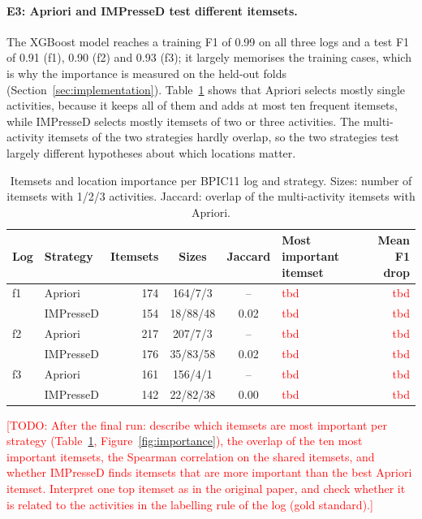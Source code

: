 \documentclass{article}
\newcommand{\todo}[1]{\textcolor{red}{[TODO: #1]}}
\newcommand{\tbd}{\textcolor{red}{tbd}}
\begin{document}
\paragraph{E3: Apriori and IMPresseD test different itemsets.} The XGBoost model reaches a training F1 of 0.99 on all three logs and a test F1 of 0.91 (f1), 0.90 (f2) and 0.93 (f3); it largely memorises the training cases, which is why the importance is measured on the held-out folds (Section~\ref{sec:implementation}). Table~\ref{tab:selection} shows that Apriori selects mostly single activities, because it keeps all of them and adds at most ten frequent itemsets, while IMPresseD selects mostly itemsets of two or three activities. The multi-activity itemsets of the two strategies hardly overlap, so the two strategies test largely different hypotheses about which locations matter.

\begin{table}[H]
    \centering
    \caption{Itemsets and location importance per BPIC11 log and strategy. Sizes: number of itemsets with 1/2/3 activities. Jaccard: overlap of the multi-activity itemsets with Apriori.}
    \label{tab:selection}
    \small
    \begin{tabular}{@{}llrcclr@{}}
        \toprule
        Log & Strategy & Itemsets & Sizes & Jaccard & Most important itemset & Mean F1 drop \\
        \midrule
        f1 & Apriori & 174 & 164/7/3 & -- & \tbd & \tbd \\
           & IMPresseD & 154 & 18/88/48 & 0.02 & \tbd & \tbd \\
        f2 & Apriori & 217 & 207/7/3 & -- & \tbd & \tbd \\
           & IMPresseD & 176 & 35/83/58 & 0.02 & \tbd & \tbd \\
        f3 & Apriori & 161 & 156/4/1 & -- & \tbd & \tbd \\
           & IMPresseD & 142 & 22/82/38 & 0.00 & \tbd & \tbd \\
        \bottomrule
    \end{tabular}
\end{table}

\todo{After the final run: describe which itemsets are most important per strategy (Table~\ref{tab:selection}, Figure~\ref{fig:importance}), the overlap of the ten most important itemsets, the Spearman correlation on the shared itemsets, and whether IMPresseD finds itemsets that are more important than the best Apriori itemset. Interpret one top itemset as in the original paper, and check whether it is related to the activities in the labelling rule of the log (gold standard).}
\end{document}
